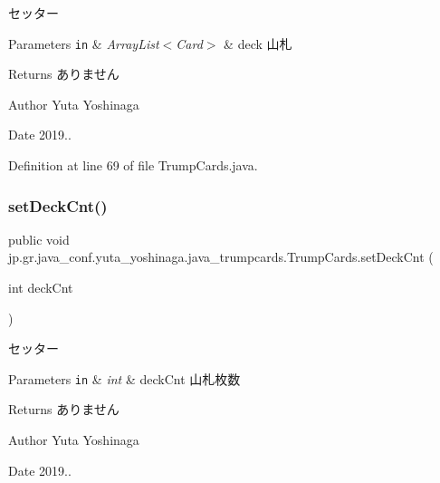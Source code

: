 セッター 


\begin{DoxyParams}[1]{Parameters}
\mbox{\tt in}  & {\em Array\+List$<$\+Card$>$} & deck 山札 \\
\hline
\end{DoxyParams}
\begin{DoxyReturn}{Returns}
ありません 
\end{DoxyReturn}
\begin{DoxyAuthor}{Author}
Yuta Yoshinaga 
\end{DoxyAuthor}
\begin{DoxyDate}{Date}
2019.. 
\end{DoxyDate}


Definition at line 69 of file Trump\+Cards.\+java.

\mbox{\label{classjp_1_1gr_1_1java__conf_1_1yuta__yoshinaga_1_1java__trumpcards_1_1_trump_cards_ace7ea688cde83158d04d827b51153fdf}} 
\subsubsection{\texorpdfstring{set\+Deck\+Cnt()}{setDeckCnt()}}
{\footnotesize\ttfamily public void jp.\+gr.\+java\+\_\+conf.\+yuta\+\_\+yoshinaga.\+java\+\_\+trumpcards.\+Trump\+Cards.\+set\+Deck\+Cnt (\begin{DoxyParamCaption}\item[{int}]{deck\+Cnt }\end{DoxyParamCaption})}



セッター 


\begin{DoxyParams}[1]{Parameters}
\mbox{\tt in}  & {\em int} & deck\+Cnt 山札枚数 \\
\hline
\end{DoxyParams}
\begin{DoxyReturn}{Returns}
ありません 
\end{DoxyReturn}
\begin{DoxyAuthor}{Author}
Yuta Yoshinaga 
\end{DoxyAuthor}
\begin{DoxyDate}{Date}
2019.. 
\end{DoxyDate}


